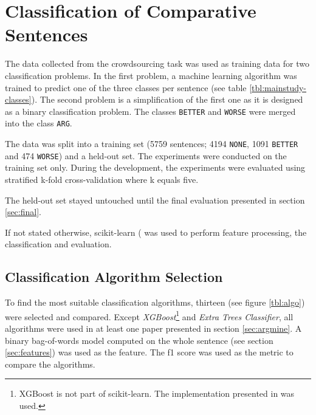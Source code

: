 \chapter{Classification of Comparative Sentences}
The data collected from the crowdsourcing task was used as training data for two classification problems. In the first problem, a machine learning algorithm was trained to predict one of the three classes per sentence (see table \ref{tbl:mainstudy-classes}). The second problem is a simplification of the first one as it is designed as a binary classification problem. The classes \texttt{BETTER} and \texttt{WORSE} were merged into the class \texttt{ARG}.

The data was split into a training set (5759 sentences; 4194 \texttt{NONE}, 1091 \texttt{BETTER} and 474 \texttt{WORSE}) and a held-out set.
The experiments were conducted on the training set only. During the development, the experiments were evaluated using stratified k-fold cross-validation where k equals five. 

The held-out set stayed untouched until the final evaluation presented in section \ref{sec:final}.

If not stated otherwise, scikit-learn (\cite{scikit-learn} was used to perform feature processing, the classification and evaluation.

\section{Classification Algorithm Selection}


To find the most suitable classification algorithms, thirteen (see figure \ref{tbl:algo}) were selected and compared. Except \emph{XGBoost}\footnote{XGBoost is not part of scikit-learn. The implementation presented in \cite{DBLP:journals/corr/ChenG16} was used.} and \emph{Extra Trees Classifier}, all algorithms were used in at least one paper presented in section \ref{sec:argmine}. A binary bag-of-words model computed on the whole sentence (see section \ref{sec:features}) was used as the feature. The f1 score was used as the metric to compare the algorithms. 

